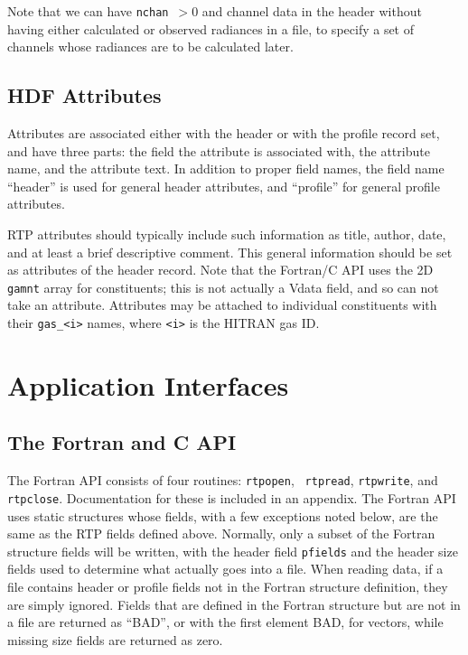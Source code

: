\documentclass[12pt]{article}
\begin{document}
Note that we can have {\tt nchan}~$>0$ and channel data in the
header without having either calculated or observed radiances in a
file, to specify a set of channels whose radiances are to be
calculated later.


\subsection{HDF Attributes}

Attributes are associated either with the header or with the
profile record set, and have three parts: the field the attribute
is associated with, the attribute name, and the attribute text.  In
addition to proper field names, the field name ``header'' is used
for general header attributes, and ``profile'' for general profile
attributes.

RTP attributes should typically include such information as title,
author, date, and at least a brief descriptive comment.  This
general information should be set as attributes of the header
record.  Note that the Fortran/C API uses the 2D {\tt gamnt} array
for constituents; this is not actually a Vdata field, and so can not
take an attribute.  Attributes may be attached to individual
constituents with their {\tt gas\_<i>} names, where {\tt <i>} is the
HITRAN gas ID.


\section{Application Interfaces}


\subsection{The Fortran and C API}

The Fortran API consists of four routines: {\tt rtpopen}, {\tt
rtpread}, {\tt rtpwrite}, and {\tt rtpclose}.  Documentation for
these is included in an appendix.  The Fortran API uses static
structures whose fields, with a few exceptions noted below, are the
same as the RTP fields defined above.  Normally, only a subset of
the Fortran structure fields will be written, with the header field
{\tt pfields} and the header size fields used to determine what
actually goes into a file.  When reading data, if a file contains
header or profile fields not in the Fortran structure definition,
they are simply ignored.  Fields that are defined in the Fortran
structure but are not in a file are returned as ``BAD'', or with the
first element BAD, for vectors, while missing size fields are
returned as zero.
\end{document}
